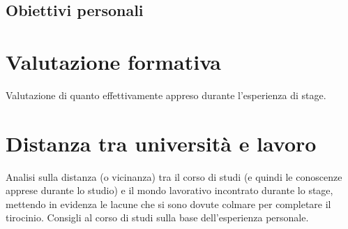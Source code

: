 \subsection{Obiettivi personali}

\section{Valutazione formativa}
Valutazione di quanto effettivamente appreso durante l'esperienza di stage.

\section{Distanza tra università e lavoro}
Analisi sulla distanza (o vicinanza) tra il corso di studi (e quindi le conoscenze apprese durante lo studio) e il mondo lavorativo incontrato durante lo stage, mettendo in evidenza le lacune che si sono dovute colmare per completare il tirocinio.
Consigli al corso di studi sulla base dell'esperienza personale.